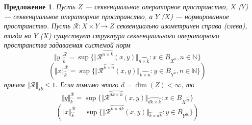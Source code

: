 \documentclass[12pt]{article}
\newtheorem{proposition}[theorem]{Предложение}
\begin{document}
\begin{proposition}\label{PrSQNormViaDuality}
Пусть $Z$ --- секвенциальное операторное пространство, $X$ ($Y$) --- секвенциальное операторное пространство, а $Y$ ($X$) --- нормированное пространство. Пусть $\mathcal{R}:X\times Y\to Z$ секвенциально изометричен справа (слева), тогда 
на $Y$ ($X$) существует структура секвенциального операторного пространства задаваемая системой норм
$$
\Vert y\Vert_{\wideparen{k}}^{\mathcal{R}}=\sup\{\Vert\mathcal{R}^{\wideparen{n\times k}}(x,y)\Vert_{\wideparen{n\times k}}:x\in B_{X^{\wideparen{n}}}, n\in\mathbb{N}\}
$$
$$
(\Vert x\Vert_{\wideparen{k}}^{\mathcal{R}}=\sup\{\Vert\mathcal{R}^{\wideparen{k\times n}}(x,y)\Vert_{\wideparen{k\times n}}:y\in B_{Y^{\wideparen{n}}}, n\in\mathbb{N}\})
$$
причем $\Vert \mathcal{R}\Vert_{sb}\leq 1$. Если помимо этого $d=\operatorname{dim}(Z)<\infty$, то
$$
\Vert y\Vert_{\wideparen{k}}^{\mathcal{R}}=\sup\{\Vert\mathcal{R}^{\wideparen{dk\times k}}(x,y)\Vert_{\wideparen{dk\times k}}:x\in B_{X^{\wideparen{dk}}}\}
$$
$$
(\Vert x\Vert_{\wideparen{k}}^{\mathcal{R}}=\sup\{\Vert\mathcal{R}^{\wideparen{k\times dk}}(x,y)\Vert_{\wideparen{k\times dk}}:y\in B_{Y^{\wideparen{dk}}}\})
$$
\end{proposition}
\end{document}
